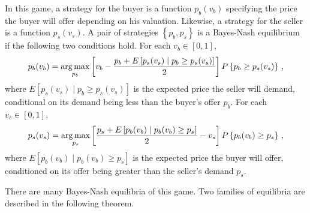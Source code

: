 In this game, a strategy for the buyer is a function $p_b(v_b)$ specifying the price the buyer will offer depending on his valuation. Likewise, a strategy for the seller is a function $p_s(v_s)$. A pair of strategies $\left\{p_b,p_s\right\}$ is a Bayes-Nash equilibrium if the following two conditions hold. For each $v_b \in [0,1]$, 
\begin{align}
 p_b(v_b) = \operatorname*{arg\,max}_{p_b} \left[v_b - \frac{p_b + E\left[p_s(v_s) \mid p_b \geq p_s(v_s)\right]}{2}\right] P \left\{p_b \geq p_s(v_s) \right\}\label{eq:auc:buyer}\,,
\end{align}
where $E\left[p_s(v_s) \mid p_b \geq p_s(v_s)\right]$ is the expected price the seller will demand, conditional on its demand being less than the buyer's offer $p_b$. For each $v_s \in [0,1]$,
\begin{align}
p_s(v_s) = \operatorname*{arg\,max}_{p_s} \left[ \frac{p_s + E\left[p_b(v_b) \mid p_b(v_b) \geq p_s\right]}{2} - v_s \right] P \left\{ p_b(v_b) \geq p_s \right\}\,, \label{eq:auc:seller}
\end{align}
where $E\left[p_b(v_b) \mid p_b(v_b) \geq p_s\right]$ is the expected price the buyer will offer, conditioned on its offer being greater than the seller's demand $p_s$.

There are many Bayes-Nash equilibria of this game. Two families of equilibria are described in the following theorem.

